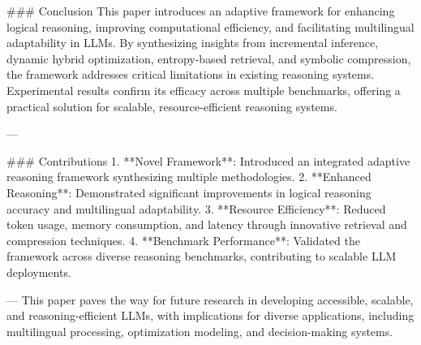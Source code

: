 ### Conclusion  
This paper introduces an adaptive framework for enhancing logical reasoning, improving computational efficiency, and facilitating multilingual adaptability in LLMs. By synthesizing insights from incremental inference, dynamic hybrid optimization, entropy-based retrieval, and symbolic compression, the framework addresses critical limitations in existing reasoning systems. Experimental results confirm its efficacy across multiple benchmarks, offering a practical solution for scalable, resource-efficient reasoning systems.  

---

### Contributions  
1. **Novel Framework**: Introduced an integrated adaptive reasoning framework synthesizing multiple methodologies.  
2. **Enhanced Reasoning**: Demonstrated significant improvements in logical reasoning accuracy and multilingual adaptability.  
3. **Resource Efficiency**: Reduced token usage, memory consumption, and latency through innovative retrieval and compression techniques.  
4. **Benchmark Performance**: Validated the framework across diverse reasoning benchmarks, contributing to scalable LLM deployments.  

---  
This paper paves the way for future research in developing accessible, scalable, and reasoning-efficient LLMs, with implications for diverse applications, including multilingual processing, optimization modeling, and decision-making systems.
